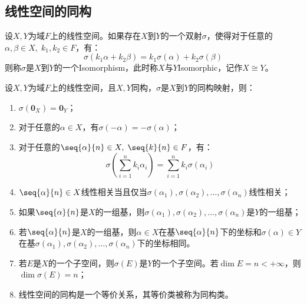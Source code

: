 \subsection{线性空间的同构}
\begin{definition}
	设$X,Y$为域$F$上的线性空间。如果存在$X$到$Y$的一个双射$\sigma$，使得对于任意的$\alpha,\beta\in X,\;k_1,k_2\in F$，有：
	\begin{equation*}
		\sigma(k_1\alpha+k_2\beta)=k_1\sigma(\alpha)+k_2\sigma(\beta)
	\end{equation*}
	则称$\sigma$是$X$到$Y$的一个\gls{Isomorphism}，此时称$X$与$Y$\gls{Isomorphic}，记作$X\cong Y$。
\end{definition}
\begin{property}\label{prop:IsomorphicOfLinearSpace}
	设$X,Y$为域$F$上的线性空间，且$X,Y$同构，$\sigma$是$X$到$Y$的同构映射，则：
	\begin{enumerate}
		\item $\sigma(\mathbf{0}_X)=\mathbf{0}_Y$；
		\item 对于任意的$\alpha\in X$，有$\sigma(-\alpha)=-\sigma(\alpha)$；
		\item 对于任意的$\seq{\alpha}{n}\in X,\;\seq{k}{n}\in F$，有：
		\begin{equation*}
			\sigma\left(\sum_{i=1}^{n}k_i\alpha_i\right)=\sum_{i=1}^{n}k_i\sigma(\alpha_i)
		\end{equation*}
		\item $\seq{\alpha}{n}\in X$线性相关当且仅当$\sigma(\alpha_1),\sigma(\alpha_2),\dots,\sigma(\alpha_n)$线性相关；
		\item 如果$\seq{\alpha}{n}$是$X$的一组基，则$\sigma(\alpha_1),\sigma(\alpha_2),\dots,\sigma(\alpha_n)$是$Y$的一组基；
		\item 若$\seq{\alpha}{n}$是$X$的一组基，则$\alpha\in X$在基$\seq{\alpha}{n}$下的坐标和$\sigma(\alpha)\in Y$在基$\sigma(\alpha_1),\sigma(\alpha_2),\dots,\sigma(\alpha_n)$下的坐标相同。
		\item 若$E$是$X$的一个子空间，则$\sigma(E)$是$Y$的一个子空间。若$\dim E=n<+\infty$，则$\dim \sigma(E)=n$；
		\item 线性空间的同构是一个等价关系，其等价类被称为同构类。
	\end{enumerate}
\end{property}
